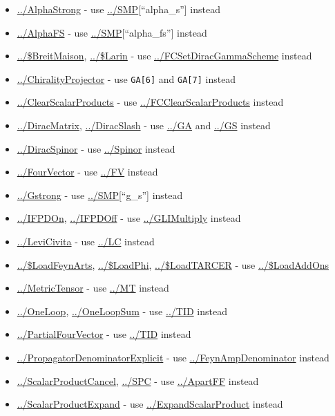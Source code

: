 \documentclass[../FeynCalcManual.tex]{subfiles}
\begin{document}
\begin{itemize}
\tightlist
\item
  \hyperlink{../alphastrong}{../AlphaStrong} - use
  \hyperlink{../smp}{../SMP}{[}``alpha\_s''{]} instead
\item
  \hyperlink{../alphafs}{../AlphaFS} - use
  \hyperlink{../smp}{../SMP}{[}``alpha\_fs''{]} instead
\item
  \hyperlink{../dollarbreitmaison}{../\$BreitMaison},
  \hyperlink{../dollarlarin}{../\$Larin} - use
  \hyperlink{../fcsetdiracgammascheme}{../FCSetDiracGammaScheme} instead
\item
  \hyperlink{../chiralityprojector}{../ChiralityProjector} - use
  \texttt{GA[\allowbreak{}6]} and \texttt{GA[\allowbreak{}7]} instead
\item
  \hyperlink{../clearscalarproducts}{../ClearScalarProducts} - use
  \hyperlink{../fcclearscalarproducts}{../FCClearScalarProducts} instead
\item
  \hyperlink{../diracmatrix}{../DiracMatrix},
  \hyperlink{../diracslash}{../DiracSlash} - use
  \hyperlink{../ga}{../GA} and \hyperlink{../gs}{../GS} instead
\item
  \hyperlink{../diracspinor}{../DiracSpinor} - use
  \hyperlink{../spinor}{../Spinor} instead
\item
  \hyperlink{../fourvector}{../FourVector} - use
  \hyperlink{../fv}{../FV} instead
\item
  \hyperlink{../gstrong}{../Gstrong} - use
  \hyperlink{../smp}{../SMP}{[}``g\_s''{]} instead
\item
  \hyperlink{../ifpdon}{../IFPDOn}, \hyperlink{../ifpdoff}{../IFPDOff} -
  use \hyperlink{../glimultiply}{../GLIMultiply} instead
\item
  \hyperlink{../levicivita}{../LeviCivita} - use
  \hyperlink{../lc}{../LC} instead
\item
  \hyperlink{../dollarloadfeynarts}{../\$LoadFeynArts},
  \hyperlink{../dollarloadphi}{../\$LoadPhi},
  \hyperlink{../dollarloadtarcer}{../\$LoadTARCER} - use
  \hyperlink{../dollarloadaddons}{../\$LoadAddOns}
\item
  \hyperlink{../metrictensor}{../MetricTensor} - use
  \hyperlink{../mt}{../MT} instead
\item
  \hyperlink{../oneloop}{../OneLoop},
  \hyperlink{../oneloopsum}{../OneLoopSum} - use
  \hyperlink{../tid}{../TID} instead
\item
  \hyperlink{../partialfourvector}{../PartialFourVector} - use
  \hyperlink{../tid}{../TID} instead
\item
  \hyperlink{../propagatordenominatorexplicit}{../PropagatorDenominatorExplicit}
  - use \hyperlink{../feynampdenominator}{../FeynAmpDenominator} instead
\item
  \hyperlink{../scalarproductcancel}{../ScalarProductCancel},
  \hyperlink{../spc}{../SPC} - use \hyperlink{../apartff}{../ApartFF}
  instead
\item
  \hyperlink{../scalarproductexpand}{../ScalarProductExpand} - use
  \hyperlink{../expandscalarproduct}{../ExpandScalarProduct} instead
\end{itemize}
\end{document}
